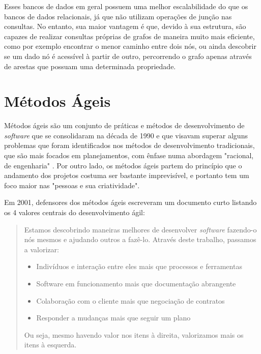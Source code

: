 
Esses bancos de dados em geral possuem uma melhor escalabilidade do que os bancos de dados relacionais, já que não utilizam operações de junção nas consultas.
No entanto, sua maior vantagem é que, devido à sua estrutura, são capazes de realizar consultas próprias de grafos de maneira muito mais eficiente, como por exemplo encontrar o menor caminho entre dois nós, ou ainda descobrir se um dado nó é acessível à partir de outro, percorrendo o grafo apenas através de arestas que possuam uma determinada propriedade.


\section{Métodos Ágeis}

Métodos ágeis são um conjunto de práticas e métodos de desenvolvimento de \emph{software} que se consolidaram na década de 1990 e que visavam superar alguns problemas que foram identificados nos métodos de desenvolvimento tradicionais, que são mais focados em planejamentos, com ênfase numa abordagem "racional, de engenharia" \cite{Dyba:2008:ESA:1379905.1379989}. Por outro lado, os métodos ágeis partem do princípio que o andamento dos projetos costuma ser bastante imprevisível, e portanto tem um foco maior nas "pessoas e sua criatividade".

Em 2001, defensores dos métodos ágeis escreveram um documento curto listando os 4 valores centrais do desenvolvimento ágil:

\begin{quote}
Estamos descobrindo maneiras melhores de desenvolver \emph{software} fazendo-o nós mesmos e ajudando outros a fazê-lo. Através deste trabalho, passamos a valorizar:
\begin{itemize}

\item    Indivíduos e interação entre eles mais que processos e ferramentas
    
\item    Software em funcionamento mais que documentação abrangente
    
\item    Colaboração com o cliente mais que negociação de contratos

\item    Responder a mudanças mais que seguir um plano

\end{itemize}
Ou seja, mesmo havendo valor nos itens à direita, valorizamos mais os itens à esquerda.\cite{agilemanifesto}
\end{quote}

